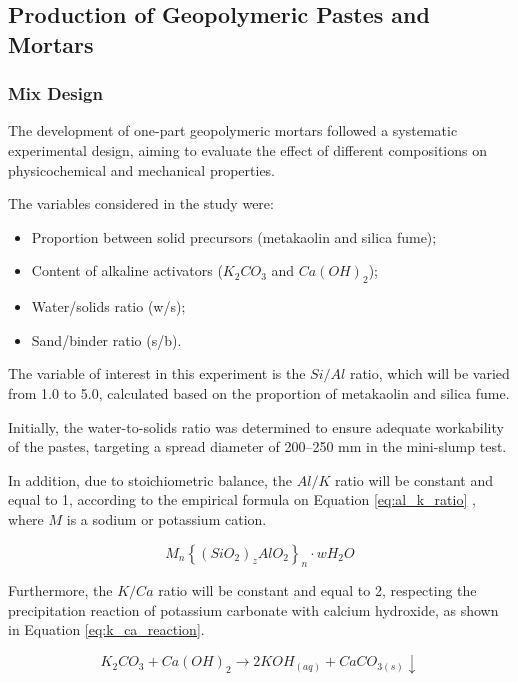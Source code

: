 \subsection{Production of Geopolymeric Pastes and Mortars}
\label{sec:production_geopolymeric_pastes_mortars}

\subsubsection{Mix Design}
\label{sec:mix_design}

The development of one-part geopolymeric mortars followed a systematic experimental design, aiming to evaluate the effect of different compositions on physicochemical and mechanical properties.

The variables considered in the study were:

\begin{itemize}
    \item Proportion between solid precursors (metakaolin and silica fume);
    \item Content of alkaline activators ($K_2CO_3$ and $Ca(OH)_2$);
    \item Water/solids ratio (w/s);
    \item Sand/binder ratio (s/b).
\end{itemize}

The variable of interest in this experiment is the $Si/Al$ ratio, which will be varied from 1.0 to 5.0, calculated based on the proportion of metakaolin and silica fume.

Initially, the water-to-solids ratio was determined to ensure adequate workability of the pastes, targeting a spread diameter of 200–250 mm in the mini-slump test.

In addition, due to stoichiometric balance, the $Al/K$ ratio will be constant and equal to 1, according to the empirical formula on Equation \ref{eq:al_k_ratio} \cite{joseph1991geopolymers}, where $M$ is a sodium or potassium cation.

\begin{equation}
    \label{eq:al_k_ratio}
    M_n \left\{ \left(SiO_2 \right)_z AlO_2 \right\}_n \cdot wH_2O
\end{equation}

Furthermore, the $K/Ca$ ratio will be constant and equal to 2, respecting the precipitation reaction of potassium carbonate with calcium hydroxide, as shown in Equation \ref{eq:k_ca_reaction}.

\begin{equation}
    \label{eq:k_ca_reaction}
    K_2CO_3 + Ca(OH)_2 \rightarrow  2KOH_{(aq)} + CaCO_{3(s)} \downarrow
\end{equation}

